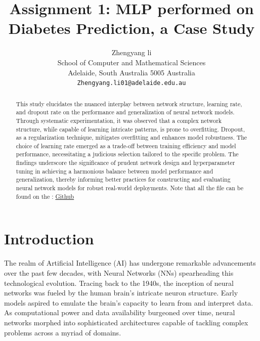 \documentclass[10pt,twocolumn,letterpaper]{article}
\begin{document}
\title{Assignment 1: MLP performed on Diabetes Prediction, a Case Study}

\author{Zhengyang li\\
   School of Computer and Mathematical Sciences\\
   Adelaide, South Australia 5005 Australia\\
   \tt\small Zhengyang.li01@adelaide.edu.au}


\maketitle

\begin{abstract}
   This study elucidates the nuanced interplay between network structure, learning rate, and dropout rate on the performance and generalization of neural network models. Through systematic experimentation, it was observed that a complex network structure, while capable of learning intricate patterns, is prone to overfitting. Dropout, as a regularization technique, mitigates overfitting and enhances model robustness. The choice of learning rate emerged as a trade-off between training efficiency and model performance, necessitating a judicious selection tailored to the specific problem. The findings underscore the significance of prudent network design and hyperparameter tuning in achieving a harmonious balance between model performance and generalization, thereby informing better practices for constructing and evaluating neural network models for robust real-world deployments. Note that all the file can be found on the : \href{https://github.com/David-Lzy/Deep_Learning_Fundamentals}{Github}
\end{abstract}

\section{Introduction}

The realm of Artificial Intelligence (AI) has undergone remarkable advancements over the past few decades, with Neural Networks (NNs) spearheading this technological evolution. Tracing back to the 1940s, the inception of neural networks was fueled by the human brain's intricate neuron structure. Early models aspired to emulate the brain's capacity to learn from and interpret data. As computational power and data availability burgeoned over time, neural networks morphed into sophisticated architectures capable of tackling complex problems across a myriad of domains.
\end{document}
